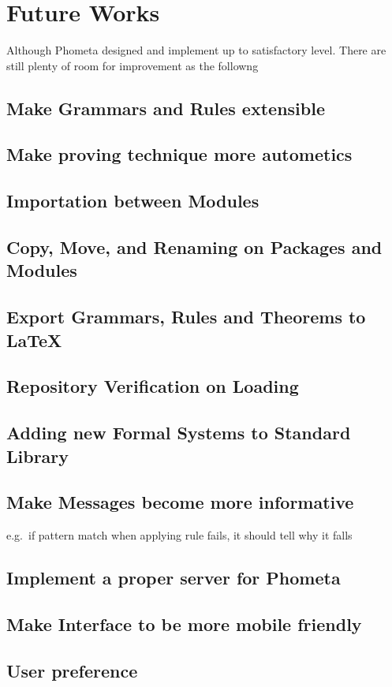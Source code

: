 \documentclass[master.tex]{subfiles}
\begin{document}
\section{Future Works}

Although Phometa designed and implement up to satisfactory level. There are
still plenty of room for improvement as the followng

\subsection{Make Grammars and Rules extensible}
\subsection{Make proving technique more autometics}
\subsection{Importation between Modules}
\subsection{Copy, Move, and Renaming on Packages and Modules}
\subsection{Export Grammars, Rules and Theorems to \LaTeX}
\subsection{Repository Verification on Loading}
\subsection{Adding new Formal Systems to Standard Library}
\subsection{Make Messages become more informative}
e.g.\ if pattern match when applying rule fails, it should tell why it falls
\subsection{Implement a proper server for Phometa}
\subsection{Make Interface to be more mobile friendly}
\subsection{User preference}
\end{document}
